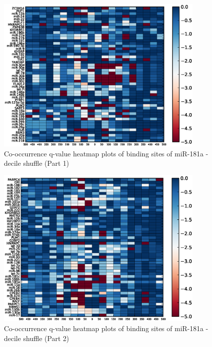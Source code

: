 \begin{figure}
   	\includegraphics[width=0.9\textwidth,clip]{appendix1/figures/miR-181a_decile_expressed_heatmap_qvalues0.eps}
   	\caption{Co-occurrence q-value heatmap plots of binding sites of miR-181a - decile shuffle (Part 1)}
\end{figure}
\clearpage
\begin{figure}
   	\includegraphics[width=0.9\textwidth,clip]{appendix1/figures/miR-181a_decile_expressed_heatmap_qvalues1.eps}
   	\caption{Co-occurrence q-value heatmap plots of binding sites of miR-181a - decile shuffle (Part 2)}
\end{figure}

